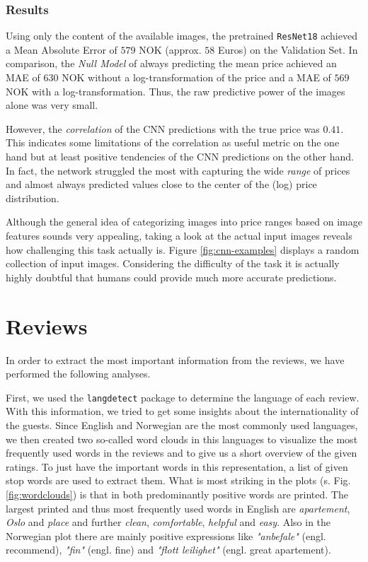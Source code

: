 \documentclass[12pt, letterpaper]{article}
\begin{document}
\subsubsection{Results}

Using only the content of the available images, the pretrained \texttt{ResNet18} achieved a Mean Absolute Error of $579$ NOK (approx. $58$ Euros) on the Validation Set.
In comparison, the \emph{Null Model} of always predicting the mean price achieved an MAE of $630$ NOK without a log-transformation of the price and a MAE of $569$ NOK with a log-transformation.
Thus, the raw predictive power of the images alone was very small.

However, the \emph{correlation} of the CNN predictions with the true price was $0.41$.
This indicates some limitations of the correlation as useful metric on the one hand but at least positive tendencies of the CNN predictions on the other hand.
In fact, the network struggled the most with capturing the wide \emph{range} of prices and almost always predicted values close to the center of the (log) price distribution.

Although the general idea of categorizing images into price ranges based on image features sounds very appealing, taking a look at the actual input images reveals how challenging this task actually is.
Figure \ref{fig:cnn-examples} displays a random collection of input images.
Considering the difficulty of the task it is actually highly doubtful that humans could provide much more accurate predictions.

\section{Reviews}

In order to extract the most important information from the reviews, we have performed the following analyses.

First, we used the \texttt{langdetect} package to determine the language of each review.
With this information, we tried to get some insights about the internationality of the guests.
Since English and Norwegian are the most commonly used languages, we then created two so-called word clouds in this languages
to visualize the most frequently used words in the reviews and to give us a short overview of the given ratings.
To just have the important words in this representation, a list of given stop words are used to extract them.
What is most striking in the plots (s. Fig. \ref{fig:wordclouds}) is that in both predominantly positive words are printed. The largest printed and thus most frequently used words in English are \textit{apartement}, \textit{Oslo} and \textit{place} and
further \textit{clean}, \textit{comfortable}, \textit{helpful} and \textit{easy}. Also in the Norwegian plot there are mainly positive expressions like \textit{"anbefale"} (engl. recommend), \textit{"fin"} (engl. fine) and \textit{"flott leilighet"} (engl. great apartement).
\end{document}
